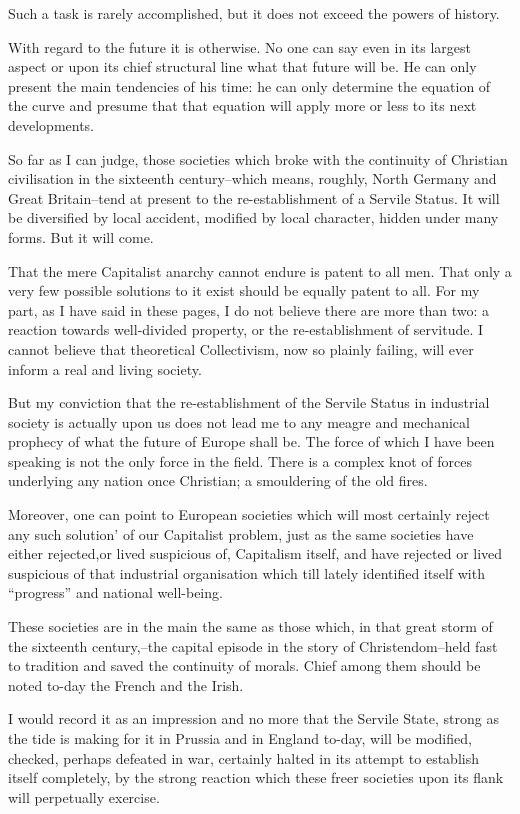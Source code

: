 \documentclass{book}
\begin{document}
Such a task is rarely accomplished, but it does not exceed the powers of history.

With regard to the future it is otherwise. No one can say even in its largest aspect or upon its chief structural line what that future will be. He can only present the main tendencies of his time: he can only determine the equation of the curve and presume that that equation will apply more or less to its next developments.

So far as I can judge, those societies which broke with the continuity of Christian civilisation in the sixteenth century–which means, roughly, North Germany and Great Britain–tend at present to the re-establishment of a Servile Status. It will be diversified by local accident, modified by local character, hidden under many forms. But it will come.

That the mere Capitalist anarchy cannot endure is patent to all men. That only a very few possible solutions to it exist should be equally patent to all. For my part, as I have said in these pages, I do not believe there are more than two: a reaction towards well-divided property, or the re-establishment of servitude. I cannot believe that theoretical Collectivism, now so plainly failing, will ever inform a real and living society.

But my conviction that the re-establishment of the Servile Status in industrial society is actually upon us does not lead me to any meagre and mechanical prophecy of what the future of Europe shall be. The force of which I have been speaking is not the only force in the field. There is a complex knot of forces underlying any nation once Christian; a smouldering of the old fires.

Moreover, one can point to European societies which will most certainly reject any such solution’ of our Capitalist problem, just as the same societies have either rejected,or lived suspicious of, Capitalism itself, and have rejected or lived suspicious of that industrial organisation which till lately identified itself with “progress” and national well-being.

These societies are in the main the same as those which, in that great storm of the sixteenth century,–the capital episode in the story of Christendom–held fast to tradition and saved the continuity of morals. Chief among them should be noted to-day the French and the Irish.

I would record it as an impression and no more that the Servile State, strong as the tide is making for it in Prussia and in England to-day, will be modified, checked, perhaps defeated in war, certainly halted in its attempt to establish itself completely, by the strong reaction which these freer societies upon its flank will perpetually exercise.
\end{document}
